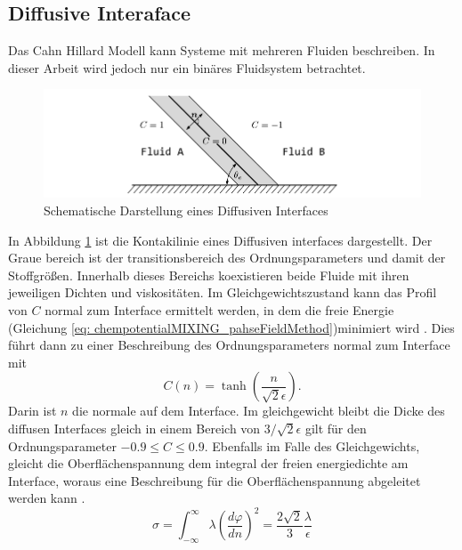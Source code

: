 \subsection{Diffusive Interaface}
Das Cahn Hillard Modell kann Systeme mit mehreren Fluiden beschreiben. In dieser Arbeit wird jedoch nur ein binäres Fluidsystem betrachtet. 
\begin{figure}[h]
    \centering
    \includegraphics[width=.95\textwidth]{Pictures/DiffusiveInterface.pdf}
    \caption{Schematische Darstellung eines Diffusiven Interfaces}
    \label{fig: DiffusiveInteraface}
\end{figure}
In Abbildung \ref{fig: DiffusiveInteraface} ist die Kontakilinie eines Diffusiven interfaces dargestellt. Der Graue bereich ist der transitionsbereich des Ordnungsparameters und damit der Stoffgrößen. Innerhalb dieses Bereichs koexistieren beide Fluide mit ihren jeweiligen Dichten und viskositäten. Im Gleichgewichtszustand kann das Profil von $C$ normal zum Interface ermittelt werden, in dem die freie Energie (Gleichung \ref{eq: chempotentialMIXING_pahseFieldMethod})minimiert wird \cite{cai2015NumericalSimulationWetting}. Dies führt dann zu einer Beschreibung des Ordnungsparameters normal zum Interface mit
\begin{equation}
    C(n) = \tanh\left(\frac{n}{\sqrt{2}\epsilon}\right).
\end{equation}
Darin ist $n$ die normale auf dem Interface. Im gleichgewicht bleibt die Dicke des diffusen Interfaces gleich in einem Bereich von $3/\sqrt{2}\epsilon$ gilt für den Ordnungsparameter $-0.9\leq C\leq0.9$. Ebenfalls im Falle des Gleichgewichts, gleicht die Oberflächenspannung dem integral der freien energiedichte am Interface, woraus eine Beschreibung für die Oberflächenspannung abgeleitet werden kann \cite{jacqmin2000ContactlineDynamicsDiffuse}. 
\begin{equation}
\label{eq: surfacetensionEqui}
    \sigma = \int_{-\infty}^{\infty}\lambda\left( \frac{d\varphi}{dn}  \right)^{2}= \frac{2\sqrt{2}}{3} \frac{\lambda}{\epsilon}
\end{equation}





